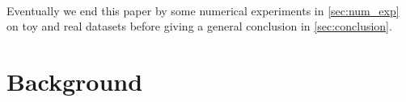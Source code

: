 \documentclass[twoside,11pt]{article}
\begin{document}
\paragraph{}
Eventually we end this paper by some numerical experiments in
\cref{sec:num_exp} on toy and real datasets before giving a general conclusion
in  \cref{sec:conclusion}.

\section{Background}
\label{sec:background}

\end{document}
